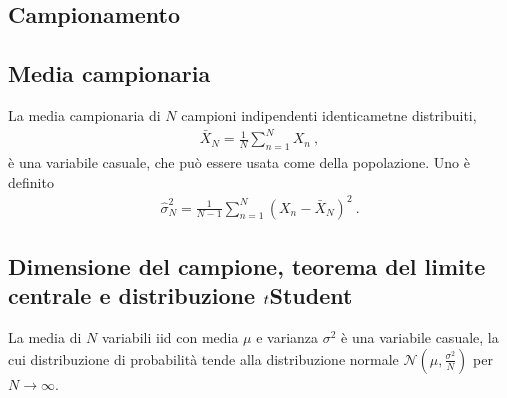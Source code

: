 \documentclass[letterpaper,10pt,italian]{jupyterBook}
\begin{document}
\subsection{Campionamento}
\label{\detokenize{ch/statistics/sampling:campionamento}}\label{\detokenize{ch/statistics/sampling::doc}}

\subsection{Media campionaria}
\label{\detokenize{ch/statistics/sampling:media-campionaria}}
\sphinxAtStartPar
La media campionaria di \(N\) campioni indipendenti identicametne distribuiti,
\begin{equation*}
\begin{split}\bar{X}_N = \frac{1}{N} \sum_{n=1}^{N} X_n \ ,\end{split}
\end{equation*}
\sphinxAtStartPar
è una variabile casuale, che può essere usata come  della popolazione. Uno  è definito
\begin{equation*}
\begin{split}\hat{\sigma}^2_N = \frac{1}{N-1} \sum_{n=1}^N (X_n - \bar{X}_N)^2 \ .\end{split}
\end{equation*}

\subsection{Dimensione del campione, teorema del limite centrale e distribuzione \protect\(t\protect\)\sphinxhyphen{}Student}
\label{\detokenize{ch/statistics/sampling:dimensione-del-campione-teorema-del-limite-centrale-e-distribuzione-t-student}}
\sphinxAtStartPar
La media di \(N\) variabili iid con media \(\mu\) e varianza \(\sigma^2\) è una variabile casuale, la cui distribuzione di probabilità tende alla distribuzione normale \(\mathscr{N}\left(\mu, \frac{\sigma^2}{N} \right)\) per \(N \rightarrow \infty\).
\end{document}

